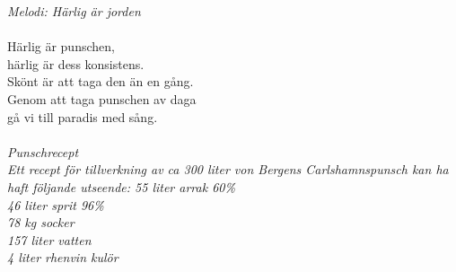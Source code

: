 {\footnotesize\textit{Melodi: Härlig är jorden}}\\
\\
Härlig är punschen,\\
härlig är dess konsistens.\\
Skönt är att taga den än en gång.\\
Genom att taga punschen av daga\\
gå vi till paradis med sång.\\
\\
{\footnotesize\textit{Punschrecept\\
Ett recept för tillverkning av ca 300 liter
von Bergens Carlshamnspunsch kan ha haft följande utseende:
55 liter arrak 60\%\\
46 liter sprit 96\%\\
78 kg socker\\
157 liter vatten\\
4 liter rhenvin
kulör}}
